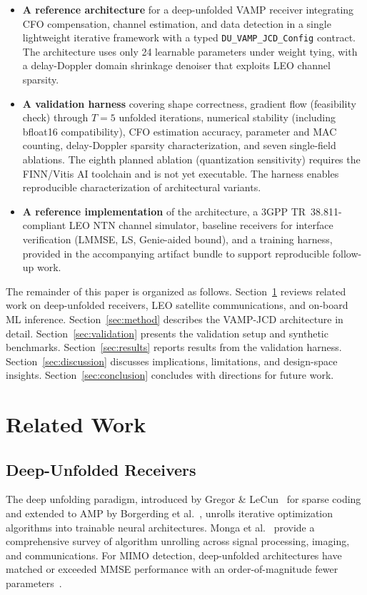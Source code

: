 \documentclass{article}
\begin{document}
\begin{itemize}
  \item \textbf{A reference architecture} for a deep-unfolded VAMP receiver integrating CFO compensation, channel estimation, and data detection in a single lightweight iterative framework with a typed \texttt{DU\_VAMP\_JCD\_Config} contract. The architecture uses only 24 learnable parameters under weight tying, with a delay-Doppler domain shrinkage denoiser that exploits LEO channel sparsity.
  \item \textbf{A validation harness} covering shape correctness, gradient flow (feasibility check) through $T=5$ unfolded iterations, numerical stability (including bfloat16 compatibility), CFO estimation accuracy, parameter and MAC counting, delay-Doppler sparsity characterization, and seven single-field ablations. The eighth planned ablation (quantization sensitivity) requires the FINN/Vitis AI toolchain and is not yet executable. The harness enables reproducible characterization of architectural variants.
  \item \textbf{A reference implementation} of the architecture, a 3GPP TR~38.811-compliant LEO NTN channel simulator, baseline receivers for interface verification (LMMSE, LS, Genie-aided bound), and a training harness, provided in the accompanying artifact bundle to support reproducible follow-up work.
\end{itemize}

The remainder of this paper is organized as follows. Section~\ref{sec:related} reviews related work on deep-unfolded receivers, LEO satellite communications, and on-board ML inference. Section~\ref{sec:method} describes the VAMP-JCD architecture in detail. Section~\ref{sec:validation} presents the validation setup and synthetic benchmarks. Section~\ref{sec:results} reports results from the validation harness. Section~\ref{sec:discussion} discusses implications, limitations, and design-space insights. Section~\ref{sec:conclusion} concludes with directions for future work.

\section{Related Work}
\label{sec:related}

\subsection{Deep-Unfolded Receivers}

The deep unfolding paradigm, introduced by Gregor \& LeCun~\cite{gregor2010learning} for sparse coding and extended to AMP by Borgerding et al.~\cite{borgerding2017amp}, unrolls iterative optimization algorithms into trainable neural architectures. Monga et al.~\cite{monga2021algorithm} provide a comprehensive survey of algorithm unrolling across signal processing, imaging, and communications. For MIMO detection, deep-unfolded architectures have matched or exceeded MMSE performance with an order-of-magnitude fewer parameters~\cite{he2018learning,samuel2014training}.
\end{document}
